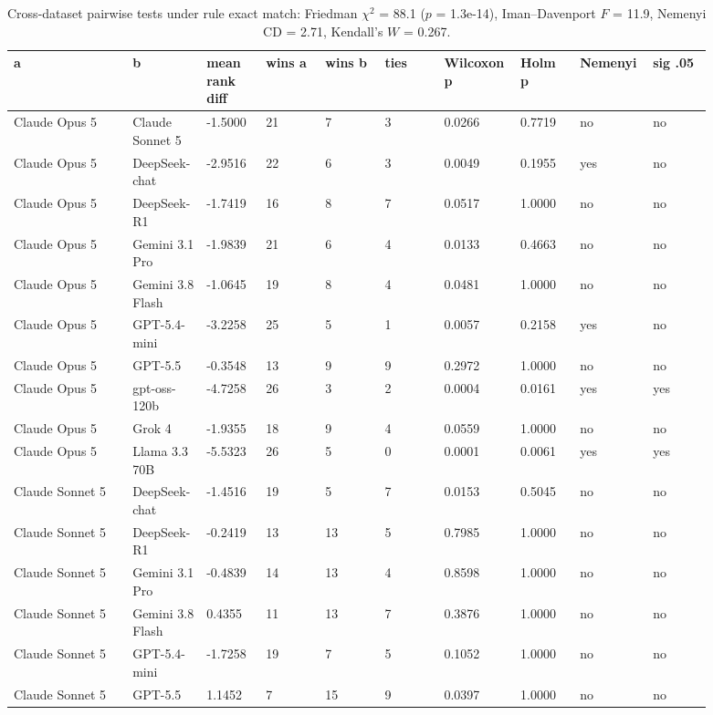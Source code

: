 \begin{landscape}
\tiny
\setlength{\tabcolsep}{3pt}
\begin{longtable}{p{0.162\linewidth}p{0.081\linewidth}p{0.081\linewidth}p{0.081\linewidth}p{0.081\linewidth}p{0.081\linewidth}p{0.081\linewidth}p{0.081\linewidth}p{0.081\linewidth}p{0.081\linewidth}}
\caption{Cross-dataset pairwise tests under rule exact match: Friedman $\chi^2$ = 88.1 ($p$ = 1.3e-14), Iman--Davenport $F$ = 11.9, Nemenyi CD = 2.71, Kendall's $W$ = 0.267.}\label{tab:pairwise_em_only}\\
\toprule
a & b & mean rank diff & wins a & wins b & ties & Wilcoxon p & Holm p & Nemenyi & sig .05 \\
\midrule
Claude Opus 5 & Claude Sonnet 5 & -1.5000 & 21 & 7 & 3 & 0.0266 & 0.7719 & no & no \\
Claude Opus 5 & DeepSeek-chat & -2.9516 & 22 & 6 & 3 & 0.0049 & 0.1955 & yes & no \\
Claude Opus 5 & DeepSeek-R1 & -1.7419 & 16 & 8 & 7 & 0.0517 & 1.0000 & no & no \\
Claude Opus 5 & Gemini 3.1 Pro & -1.9839 & 21 & 6 & 4 & 0.0133 & 0.4663 & no & no \\
Claude Opus 5 & Gemini 3.8 Flash & -1.0645 & 19 & 8 & 4 & 0.0481 & 1.0000 & no & no \\
Claude Opus 5 & GPT-5.4-mini & -3.2258 & 25 & 5 & 1 & 0.0057 & 0.2158 & yes & no \\
Claude Opus 5 & GPT-5.5 & -0.3548 & 13 & 9 & 9 & 0.2972 & 1.0000 & no & no \\
Claude Opus 5 & gpt-oss-120b & -4.7258 & 26 & 3 & 2 & 0.0004 & 0.0161 & yes & yes \\
Claude Opus 5 & Grok 4 & -1.9355 & 18 & 9 & 4 & 0.0559 & 1.0000 & no & no \\
Claude Opus 5 & Llama 3.3 70B & -5.5323 & 26 & 5 & 0 & 0.0001 & 0.0061 & yes & yes \\
Claude Sonnet 5 & DeepSeek-chat & -1.4516 & 19 & 5 & 7 & 0.0153 & 0.5045 & no & no \\
Claude Sonnet 5 & DeepSeek-R1 & -0.2419 & 13 & 13 & 5 & 0.7985 & 1.0000 & no & no \\
Claude Sonnet 5 & Gemini 3.1 Pro & -0.4839 & 14 & 13 & 4 & 0.8598 & 1.0000 & no & no \\
Claude Sonnet 5 & Gemini 3.8 Flash & 0.4355 & 11 & 13 & 7 & 0.3876 & 1.0000 & no & no \\
Claude Sonnet 5 & GPT-5.4-mini & -1.7258 & 19 & 7 & 5 & 0.1052 & 1.0000 & no & no \\
Claude Sonnet 5 & GPT-5.5 & 1.1452 & 7 & 15 & 9 & 0.0397 & 1.0000 & no & no \\

\end{longtable}
\end{landscape}
